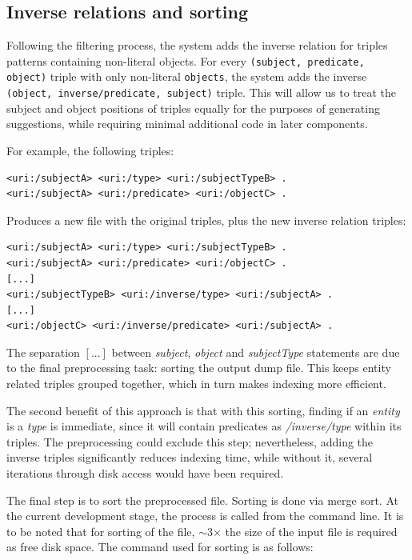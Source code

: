 \subsection{Inverse relations and sorting}

Following the filtering process, the system adds the inverse relation for triples patterns containing non-literal objects. 
For every \texttt{(subject, predicate, object)} triple with only non-literal \texttt{objects}, the system adds the inverse \texttt{(object, inverse/predicate, subject)} triple. This will allow us to treat the subject and object positions of triples equally for the purposes of generating suggestions, while requiring minimal additional code in later components.

\begin{example}
For example, the following triples:

\begin{verbatim}
<uri:/subjectA> <uri:/type> <uri:/subjectTypeB> .
<uri:/subjectA> <uri:/predicate> <uri:/objectC> .
\end{verbatim}

Produces a new file with the original triples, plus the new inverse relation triples:

\begin{verbatim}
<uri:/subjectA> <uri:/type> <uri:/subjectTypeB> .
<uri:/subjectA> <uri:/predicate> <uri:/objectC> .
[...]
<uri:/subjectTypeB> <uri:/inverse/type> <uri:/subjectA> .
[...]
<uri:/objectC> <uri:/inverse/predicate> <uri:/subjectA> .
\end{verbatim}

The separation $[...]$ between \textit{subject}, \textit{object} and \textit{subjectType} statements are due to the final preprocessing task: sorting the output dump file. 
This keeps entity related triples grouped together, which in turn makes indexing more efficient.

\end{example}

The second benefit of this approach is that with this sorting, finding if an \textit{entity} is a \textit{type} is immediate, since it will contain predicates as \textit{/inverse/type} within its triples. 
The preprocessing could exclude this step; nevertheless, adding the inverse triples significantly reduces indexing time, while without it, several iterations through disk access would have been required. 

The final step is to sort the preprocessed file. Sorting is done via merge sort. At the current development stage, the process is called from the command line. It is to be noted that for sorting of the file, $\sim$3$\times$ the size of the input file is required as free disk space. The command used for sorting is as follows: 

